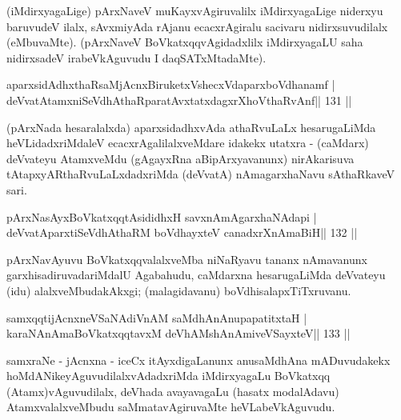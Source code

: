 \begin{artha}
(iMdirxyagaLige) pArxNaveV muKayxvAgiruvalilx iMdirxyagaLige niderxyu  baruvudeV ilalx, sAvxmiyAda rAjanu ecacxrAgiralu sacivaru nidirxsuvudilalx (eMbuvaMte). (pArxNaveV BoVkatxqqvAgidadxlilx iMdirxyagaLU saha nidirxsadeV irabeVkAguvudu I daqSATxMtadaMte).
\end{artha}


\begin{shl}
aparxsidAdhxthaRsaMjAcnxBiruketxVshecxVdaparxboVdhanamf |
deVvatAtamxniSeVdhAthaRparatAvxtatxdagxrXhoV\s thaRvAnf\hfill || 131 ||
\end{shl}

\begin{artha}
(pArxNada hesaralalxda) aparxsidadhxvAda athaRvuLaLx hesarugaLiMda  heVLidadxriMdaleV ecacxrAgalilalxveMdare idakekx utatxra - (caMdarx) deVvateyu AtamxveMdu (gAgayxRna aBipArxyavanunx) nirAkarisuva tAtapxyARthaRvuLaLxdadxriMda (deVvatA) nAmagarxhaNavu sAthaRkaveV sari.
\end{artha}


\begin{shl}
pArxNasAyxBoVkatxqqtAsididhxH savxnAmAgarxhaNAdapi |
deVvatAparxtiSeVdhAthaRM boVdhayxteV  canadxrXnAmaBiH\hfill || 132 ||
\end{shl}

\begin{artha}
pArxNavAyuvu BoVkatxqqvalalxveMba niNaRyavu tananx nAmavanunx garxhisadiruvadariMdalU Agabahudu, caMdarxna hesarugaLiMda deVvateyu (idu) alalxveMbudakAkxgi; (malagidavanu) boVdhisalapxTiTxruvanu.
\end{artha}


\begin{shl}
samxqqtijAcnxneVSaNAdiVnAM saMdhAnAnupapatitxtaH |
karaNAnAmaBoVkatxqqtavxM deVhAMshAnAmiveVSayxteV\hfill || 133 ||
\end{shl}

\begin{artha}
samxraNe - jAcnxna - iceCx itAyxdigaLanunx anusaMdhAna mADuvudakekx hoMdANikeyAguvudilalxvAdadxriMda iMdirxyagaLu BoVkatxqq (Atamx)vAguvudilalx, deVhada avayavagaLu (hasatx modalAdavu) AtamxvalalxveMbudu saMmatavAgiruvaMte heVLabeVkAguvudu.
\end{artha}

